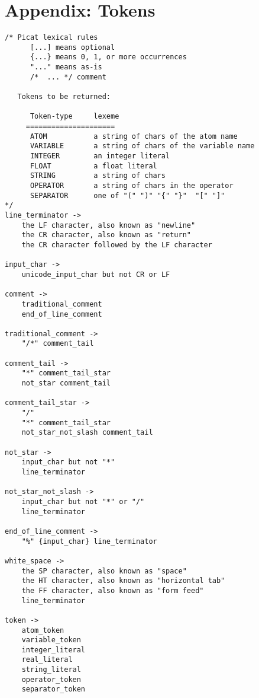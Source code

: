 
\chapter{\label{chapter:lex}Appendix: Tokens}
\begin{scriptsize}
\begin{verbatim}
/* Picat lexical rules 
      [...] means optional
      {...} means 0, 1, or more occurrences
      "..." means as-is
      /*  ... */ comment

   Tokens to be returned:

      Token-type     lexeme
     =====================
      ATOM           a string of chars of the atom name
      VARIABLE       a string of chars of the variable name
      INTEGER        an integer literal
      FLOAT          a float literal
      STRING         a string of chars 
      OPERATOR       a string of chars in the operator
      SEPARATOR      one of "(" ")" "{" "}"  "[" "]"  
*/
line_terminator ->
    the LF character, also known as "newline"
    the CR character, also known as "return"
    the CR character followed by the LF character

input_char ->
    unicode_input_char but not CR or LF

comment ->
    traditional_comment
    end_of_line_comment

traditional_comment ->
    "/*" comment_tail

comment_tail ->
    "*" comment_tail_star
    not_star comment_tail

comment_tail_star ->
    "/"
    "*" comment_tail_star
    not_star_not_slash comment_tail

not_star ->
    input_char but not "*"
    line_terminator

not_star_not_slash ->
    input_char but not "*" or "/"
    line_terminator

end_of_line_comment ->
    "%" {input_char} line_terminator

white_space ->
    the SP character, also known as "space"
    the HT character, also known as "horizontal tab"
    the FF character, also known as "form feed"
    line_terminator

token ->
    atom_token
    variable_token
    integer_literal
    real_literal
    string_literal
    operator_token
    separator_token


\end{verbatim}
\end{scriptsize}
